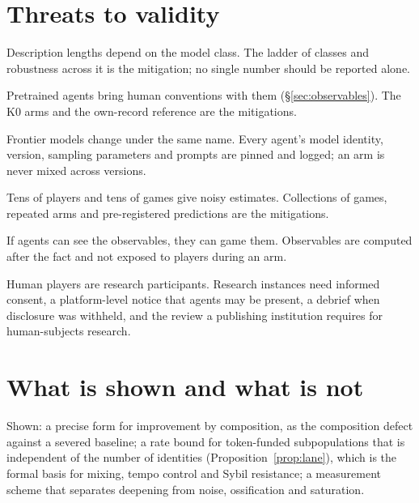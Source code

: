 \documentclass[11pt,a4paper]{article}
\begin{document}
\section{Threats to validity}\label{sec:threats}

\begin{description}[leftmargin=1.2em,itemsep=4pt,font=\normalfont\spartansemi]
\item[Model relativity.] Description lengths depend on the model class. The ladder of classes and
  robustness across it is the mitigation; no single number should be reported alone.
\item[Imported discourse.] Pretrained agents bring human conventions with them
  (\S\ref{sec:observables}). The K0 arms and the own-record reference are the mitigations.
\item[Model drift.] Frontier models change under the same name. Every agent's model identity,
  version, sampling parameters and prompts are pinned and logged; an arm is never mixed across
  versions.
\item[Small numbers.] Tens of players and tens of games give noisy estimates. Collections of games,
  repeated arms and pre-registered predictions are the mitigations.
\item[Goodhart.] If agents can see the observables, they can game them. Observables are computed
  after the fact and not exposed to players during an arm.
\item[People.] Human players are research participants. Research instances need informed consent,
  a platform-level notice that agents may be present, a debrief when disclosure was withheld, and
  the review a publishing institution requires for human-subjects research.
\end{description}

\section{What is shown and what is not}

Shown: a precise form for improvement by composition, as the composition defect against a
severed baseline; a rate bound for token-funded subpopulations that is independent of the number
of identities (Proposition~\ref{prop:lane}), which is the formal basis for mixing, tempo control and
Sybil resistance; a measurement scheme that separates deepening from noise, ossification and
saturation.
\end{document}
